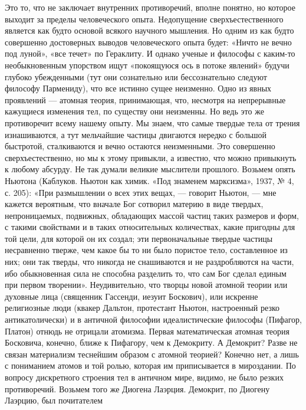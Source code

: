 Это  то, что  не  заключает внутренних  противоречий, вполне  понятно,
но  которое  выходит  за   пределы  человеческого  опыта.  Недопущение
сверхъестественного  является  как   будто  основой  всякого  научного
мышления.  Но  одним  из  как  будто  совершенно  достоверных  выводов
человеческого опыта будет: «Ничто не  вечно под луной», «все течет» по
Гераклиту.  И  однако  ученые  и философы  с  каким-то  необыкновенным
упорством  ищут  «покоящуюся  ось  в потоке  явлений»  будучи  глубоко
убежденными (тут  они сознательно или бессознательно  следуют философу
Пармениду), что все истинно сущее  неизменно. Одно из явных проявлений
---  атомная   теория,  принимающая,  что,  несмотря   на  непрерывные
кажущиеся изменения  тел, по  существу они неизменны.  Но ведь  это же
противоречит всему нашему  опыту. Мы знаем, что самые  твердые тела от
трения  изнашиваются, а  тут  мельчайшие частицы  двигаются нередко  с
большой  быстротой, сталкиваются  и  вечно  остаются неизменными.  Это
совершенно сверхъестественно, но мы к  этому привыкли, а известно, что
можно привыкнуть  к любому  абсурду. Не  так думали  великие мыслители
прошлого.  Возьмем опять  Ньютона  (Каблуков. Ньютон  как химик.  «Под
знаменем марксизма», 1937, № 4, с.  205): «При размышлении о всех этих
вещах, --- говорит Ньютон, ---  мне кажется вероятным, что вначале Бог
сотворил материю в виде  твердых, непроницаемых, подвижных, обладающих
массой частиц  таких размеров и  форм, с  такими свойствами и  в таких
относительных количествах, какие пригодны для той цели, для которой он
их создал; эти первоначальные  твердые частицы несравненно тверже, чем
какое  бы то  ни  было пористое  тело, составленное  из  них; они  так
тверды, что  никогда не снашиваются  и не раздробляются на  части, ибо
обыкновенная сила не способна разделить  то, что сам Бог сделал единым
при первом  творении». Неудивительно, что творцы  новой атомной теории
или духовные лица (священник  Гассенди, иезуит Боскович), или искренне
религиозные люди (квакер Дальтон, протестант Ньютон, настроенный резко
антикатолически)  и  в  античной  философии  идеалистические  философы
(Пифагор, Платон)  отнюдь не отрицали атомизма.  Первая математическая
атомная теория Босковича, конечно, ближе  к Пифагору, чем к Демокриту.
А Демокрит?  Разве не связан  материализм теснейшим образом  с атомной
теорией? Конечно нет, а лишь с  пониманием атомов и той ролью, которая
им приписывается в  мироздании. По вопросу дискретного  строения тел в
античном  мире,  видимо, не  было  резких  противоречий. Возьмем  того
же  Диогена Лаэрция.  Демокрит,  по Диогену  Лаэрцию, был  почитателем
